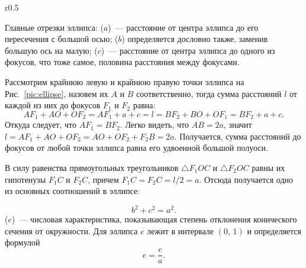 \begin{wrapfigure}[10]{r}{0.5\tw}
	\label{pic:ellipse}
\end{wrapfigure}
Главные отрезки эллипса:  ($a$)~--- расстояние от центра эллипса до его пересечения с большой осью;  ($b$) определяется дословно также, заменив большую ось на малую;  ($c$)~--- расстояние от центра эллипса до одного из фокусов, что тоже самое, половина расстояния между фокусами.

Рассмотрим крайнюю левую и крайнюю правую точки эллипса на Рис.~\ref{pic:ellipse}, назовем их $A$ и $B$ соответственно, тогда сумма расстояний $l$ от каждой из них до фокусов $F_1$ и $F_2$ равна:
\begin{equation*}
	AF_1 + AO + OF_2 = AF_1 + a + c = l = BF_2 + BO + OF_1 = BF_2 + a + c.
\end{equation*}
Откуда следует, что $A F_1 = B F_2$. Легко видеть, что $AB = 2a$, значит $l = AF_1 + AO + OF_2 = AO + OF_2 + F_2B = 2a$. Получается, сумма расстояний до фокусов от любой точки эллипса равна его удвоенной большой полуоси.

В силу равенства прямоугольных треугольников $\triangle F_1 O C$ и $\triangle F_2 O C$ равны их гипотенузы $F_1C$ и $F_2C$, причем $F_1C= F_2C = l/2 = a$. Отсюда получается одно из основных соотношений в эллипсе:

\begin{equation}
	b^2 + c^2 = a^2.
\end{equation}
 ($e$)~--- числовая
характеристика, показывающая степень отклонения конического сечения от окружности. Для эллипса $e$ лежит в интервале $(0, \, 1)$ и
определяется формулой
\begin{equation}
	e = \frac{c}{a}.
\end{equation}

